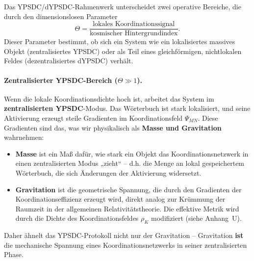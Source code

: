 \documentclass[12pt,a4paper]{article}
\theoremstyle{remark}
\begin{document}
	Das YPSDC/dYPSDC-Rahmenwerk unterscheidet zwei operative Bereiche, die durch den dimensionslosen Parameter
	\begin{equation}
		\Theta = \frac{\text{lokales Koordinationssignal}}{\text{kosmischer Hintergrundindex}}.
	\end{equation}
	Dieser Parameter bestimmt, ob sich ein System wie ein lokalisiertes massives Objekt (zentralisiertes YPSDC) oder als Teil eines gleichförmigen, nichtlokalen Feldes (dezentralisiertes dYPSDC) verhält.
	
	\paragraph{Zentralisierter YPSDC-Bereich (\(\Theta \gg 1\)).}
	Wenn die lokale Koordinationsdichte hoch ist, arbeitet das System im \textbf{zentralisierten YPSDC}-Modus. Das Wörterbuch ist stark lokalisiert, und seine Aktivierung erzeugt steile Gradienten im Koordinationsfeld \(\Psi_{MN}\). Diese Gradienten sind das, was wir physikalisch als \textbf{Masse und Gravitation} wahrnehmen:
	
	\begin{itemize}
		\item \textbf{Masse} ist ein Maß dafür, wie stark ein Objekt das Koordinationsnetzwerk in einen zentralisierten Modus „zieht“ – d.h. die Menge an lokal gespeichertem Wörterbuch, die sich Änderungen der Aktivierung widersetzt.
		\item \textbf{Gravitation} ist die geometrische Spannung, die durch den Gradienten der Koordinationseffizienz erzeugt wird, direkt analog zur Krümmung der Raumzeit in der allgemeinen Relativitätstheorie. Die effektive Metrik wird durch die Dichte des Koordinationsfeldes \(\rho_K\) modifiziert (siehe Anhang~U).
	\end{itemize}
	
	Daher ähnelt das YPSDC-Protokoll nicht nur der Gravitation – Gravitation \textbf{ist} die mechanische Spannung eines Koordinationsnetzwerks in seiner zentralisierten Phase.
	
\end{document}
